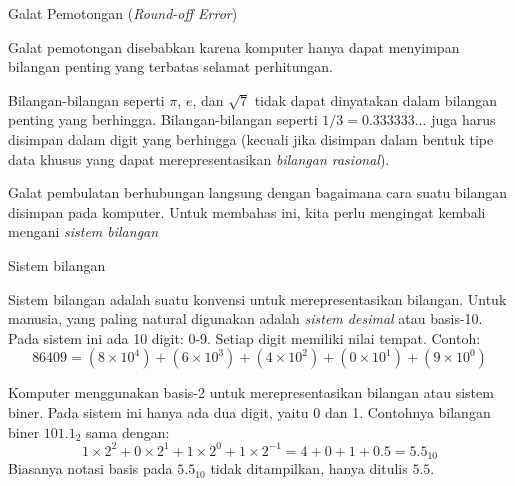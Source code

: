 \begin{frame}{Galat Pemotongan (\textit{Round-off Error})}

Galat pemotongan disebabkan karena komputer hanya dapat menyimpan bilangan penting
yang terbatas selamat perhitungan.

Bilangan-bilangan seperti $\pi$, $e$, dan $\sqrt{7}$ tidak dapat dinyatakan
dalam bilangan penting yang berhingga.
Bilangan-bilangan seperti $1/3 = 0.333333\ldots$ juga harus disimpan dalam digit
yang berhingga (kecuali jika disimpan dalam bentuk tipe data khusus yang dapat merepresentasikan
\emph{bilangan rasional}).

Galat pembulatan berhubungan langsung dengan bagaimana cara suatu bilangan
disimpan pada komputer. Untuk membahas ini, kita perlu mengingat kembali
mengani \emph{sistem bilangan}

\end{frame}


\begin{frame}{Sistem bilangan}

Sistem bilangan adalah suatu konvensi untuk merepresentasikan bilangan.
Untuk manusia, yang paling natural digunakan adalah \emph{sistem desimal} atau
basis-10. Pada sistem ini ada 10 digit: 0-9. Setiap digit memiliki nilai tempat.
Contoh:
$$
86409 = (8 \times 10^4) + (6 \times 10^3) + (4 \times 10^2) + (0 \times 10^1) +
(9\times 10^0)
$$

Komputer menggunakan basis-2 untuk merepresentasikan bilangan atau sistem biner.
Pada sistem ini hanya ada dua digit, yaitu 0 dan 1.
Contohnya bilangan biner $101.1_{2}$ sama dengan:
\begin{equation*}
1 \times 2^2 + 0 \times 2^1 + 1 \times 2^0 + 1 \times 2^{-1} = 4 + 0 + 1 + 0.5 = 5.5_{10}
\end{equation*}
Biasanya notasi basis pada $5.5_{10}$ tidak ditampilkan, hanya ditulis $5.5$.

\end{frame}



